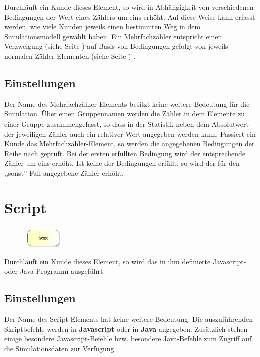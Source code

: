 Durchläuft ein Kunde dieses Element, so wird in Abhängigkeit von verschiedenen Bedingungen
der Wert eines Zählers um eins erhöht. Auf diese Weise kann erfasst werden, wie viele Kunden
jeweils einen bestimmten Weg in dem Simulationsmodell gewählt haben. Ein Mehrfachzähler
entspricht einer Verzweigung (siehe Seite \pageref{ref:ModelElementDecide}) auf Basis von Bedingungen
gefolgt von jeweils normalen Zähler-Elementen (siehe Seite \pageref{ref:ModelElementCounter}) .

\subsection*{Einstellungen}

Der Name des Mehrfachzähler-Elements besitzt keine weitere Bedeutung für die Simulation.
Über einen Gruppennamen werden die Zähler in dem Elemente zu einer Gruppe zusammengefasst,
so dass in der Statistik neben dem Absolutwert der jeweiligen Zähler auch ein relativer
Wert angegeben werden kann. Passiert ein Kunde das Mehrfachzähler-Element, so werden die
angegebenen Bedingungen der Reihe nach geprüft. Bei der ersten erfüllten Bedingung wird
der entsprechende Zähler um eins erhöht. Ist keine der Bedingungen erfüllt, so wird der
für den ,,sonst''-Fall angegebene Zähler erhöht. 


\section{Script}
\label{ref:ModelElementSetJS}

\begin{figure}
\vspace{-22pt}
\includegraphics[width=2cm]{imageModelElementSetJS.png}
\vspace{-22pt}
\end{figure}

Durchläuft ein Kunde dieses Element, so wird das in ihm definierte Javascript- oder Java-Programm ausgeführt.

\subsection*{Einstellungen}

Der Name des Script-Elements hat keine weitere Bedeutung. Die auszuführenden Skriptbefehle werden in
\textbf{Javascript} oder in \textbf{Java} angegeben. Zusätzlich stehen einige
besondere Javascript-Befehle bzw. besondere Java-Befehle 
zum Zugriff auf die Simulationsdaten zur Verfügung.

